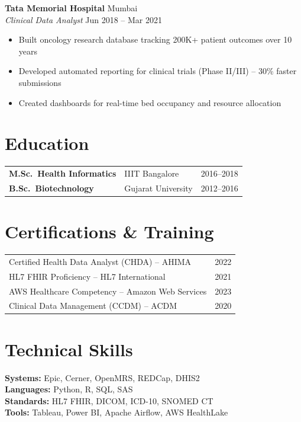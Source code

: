 \documentclass[10pt,letterpaper]{article}
\begin{document}
\textbf{Tata Memorial Hospital} \hfill Mumbai\\
\textit{Clinical Data Analyst} \hfill Jun 2018 -- Mar 2021
\begin{itemize}
\item Built oncology research database tracking 200K+ patient outcomes over 10 years
\item Developed automated reporting for clinical trials (Phase II/III) -- 30\% faster submissions
\item Created dashboards for real-time bed occupancy and resource allocation
\end{itemize}

\section{Education}
\begin{tabularx}{\linewidth}{@{}Xlr@{}}
\textbf{M.Sc.\ Health Informatics} & IIIT Bangalore & 2016--2018\\
\textbf{B.Sc.\ Biotechnology} & Gujarat University & 2012--2016\\
\end{tabularx}

\section{Certifications \& Training}
\begin{tabularx}{\linewidth}{@{}Xr@{}}
Certified Health Data Analyst (CHDA) -- AHIMA & 2022\\
HL7 FHIR Proficiency -- HL7 International & 2021\\
AWS Healthcare Competency -- Amazon Web Services & 2023\\
Clinical Data Management (CCDM) -- ACDM & 2020\\
\end{tabularx}

\section{Technical Skills}
\textbf{Systems:} Epic, Cerner, OpenMRS, REDCap, DHIS2\\
\textbf{Languages:} Python, R, SQL, SAS\\
\textbf{Standards:} HL7 FHIR, DICOM, ICD-10, SNOMED CT\\
\textbf{Tools:} Tableau, Power BI, Apache Airflow, AWS HealthLake
\end{document}
